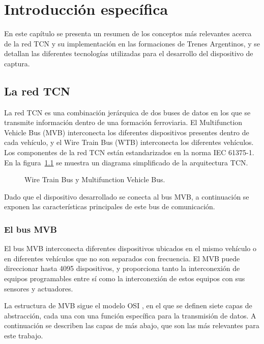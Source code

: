 \chapter{Introducción específica}

En este capítulo se presenta un resumen de los conceptos más relevantes acerca de la red TCN y su implementación en las formaciones de Trenes Argentinos, y se detallan las diferentes tecnologías utilizadas para el desarrollo del dispositivo de captura.

\section{La red TCN}

La red TCN es una combinación jerárquica de dos buses de datos en los que se transmite información dentro de una formación ferroviaria. El Multifunction Vehicle Bus (MVB) interconecta los diferentes dispositivos presentes dentro de cada vehículo, y el Wire Train Bus (WTB) interconecta los diferentes vehículos. Los componentes de la red TCN están estandarizados en la norma IEC 61375-1. En la figura~\ref{fig:tcn-mvb-wtb} se muestra un diagrama simplificado de la arquitectura TCN.

\begin{figure}[htbp]
	\centering
    {
    \fontsize{9pt}{9pt}\selectfont
    
    }
	\caption[Wire Train Bus y Multifunction Vehicle Bus]{Wire Train Bus y Multifunction Vehicle Bus.\footnotemark}
    \label{fig:tcn-mvb-wtb}
\end{figure}

Dado que el dispositivo desarrollado se conecta al bus MVB, a continuación se exponen las características principales de este bus de comunicación.

\subsection{El bus MVB}

El bus MVB interconecta diferentes dispositivos ubicados en el mismo vehículo o en diferentes vehículos que no son separados con frecuencia. El MVB puede direccionar hasta 4095 dispositivos, y proporciona tanto la interconexión de equipos programables entre sí como la interconexión de estos equipos con sus sensores y actuadores.

La estructura de MVB sigue el modelo OSI \cite{ISO7498-1}, en el que se definen siete capas de abstracción, cada una con una función específica para la transmisión de datos. A continuación se describen las capas de más abajo, que son las más relevantes para este trabajo.

